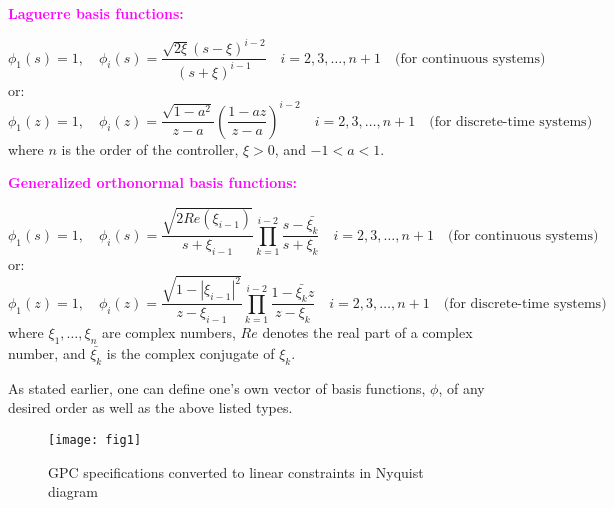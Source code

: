\documentclass [12pt , a4paper] {article}
\begin{document}
\textcolor{magenta}{\textbf{Laguerre basis functions:}}

\begin{equation}
\phi_1(s)=1, \quad \phi_i(s)=\frac{\sqrt{2\xi}(s-\xi)^{i-2}}{(s+\xi)^{i-1}} \quad   i=2,3,\ldots,n+1 \quad \mbox{(for continuous systems)}
\end{equation}
or:
\begin{equation}
\phi_1(z)=1, \quad \phi_i(z)=\frac{\sqrt{1-a^2}}{z-a} \left(\frac{1-az}{z-a}\right)^{i-2} \quad   i=2,3,\ldots,n+1 \quad \mbox{(for discrete-time systems)}
\end{equation}
where $n$ is the order of the controller, $\xi>0$, and $-1<a<1$.

\textcolor{magenta}{\textbf{Generalized orthonormal basis functions:}}

\begin{equation}
\phi_1(s)=1, \quad \phi_i(s)=\frac{\sqrt{2Re(\xi_{i-1})}}{s+\xi_{i-1}} \prod_{k=1}^{i-2}\frac{s-\bar{\xi_k}}{s+\xi_k} \quad  i=2,3,\ldots,n+1 \quad \mbox{(for continuous systems)}
\end{equation}
or:
\begin{equation}
\phi_1(z)=1, \quad \phi_i(z)=\frac{\sqrt{1-|\xi_{i-1}|^2}}{z-\xi_{i-1}} \prod_{k=1}^{i-2}\frac{1-\bar{\xi_k}z}{z-\xi_k} \quad  i=2,3,\ldots,n+1 \quad \mbox{(for discrete-time systems)}
\end{equation}
where $\xi_1, \ldots, \xi_n$ are complex numbers, $Re$ denotes the real part of a complex number, and $\bar{\xi_k}$ is the complex conjugate of $\xi_k$.

As stated earlier, one can define one's own vector of basis functions, $\phi$, of any desired order as well as the above listed types.

\begin{figure}
\centering
\texttt{[image: fig1]}
\caption{GPC specifications converted to linear constraints in Nyquist diagram}
\label{fig:GPC}
\end{figure}
\end{document}
